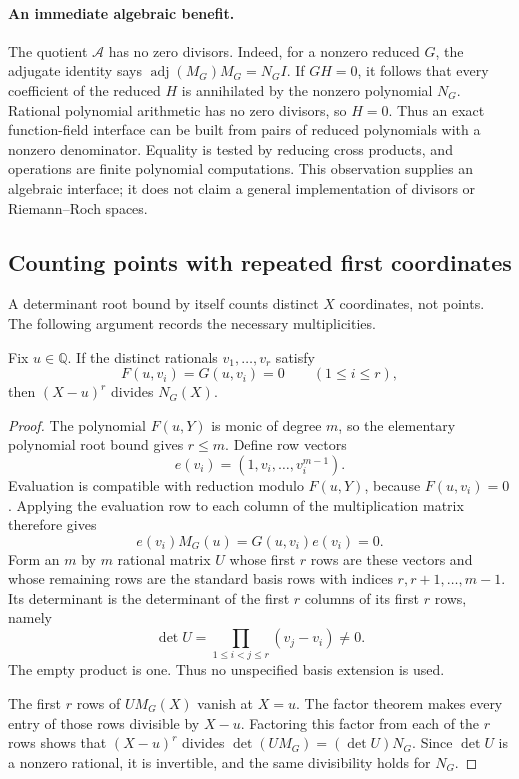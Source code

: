 \paragraph{An immediate algebraic benefit.}
The quotient $\mathcal A$ has no zero divisors.  Indeed, for a nonzero
reduced $G$, the adjugate identity says
$\operatorname{adj}(M_G)M_G=N_G I$.  If $GH=0$, it follows that every
coefficient of the reduced $H$ is annihilated by the nonzero polynomial
$N_G$.  Rational polynomial arithmetic has no zero divisors, so $H=0$.
Thus an exact function-field interface can be built from pairs of
reduced polynomials with a nonzero denominator.  Equality is tested by
reducing cross products, and operations are finite polynomial
computations.  This observation supplies an algebraic interface; it does
not claim a general implementation of divisors or Riemann--Roch spaces.

\subsection{Counting points with repeated first coordinates}

A determinant root bound by itself counts distinct $X$ coordinates, not
points.  The following argument records the necessary multiplicities.

\begin{lemma}\label{lem:weighted-fiber}
Fix $u\in\mathbb Q$.  If the distinct rationals
$v_1,\ldots,v_r$ satisfy
\[
 F(u,v_i)=G(u,v_i)=0\qquad(1\le i\le r),
\]
then $(X-u)^r$ divides $N_G(X)$.
\end{lemma}

\begin{proof}
The polynomial $F(u,Y)$ is monic of degree $m$, so the elementary
polynomial root bound gives $r\le m$.  Define row vectors
\[
 e(v_i)=(1,v_i,\ldots,v_i^{m-1}).
\]
Evaluation is compatible with reduction modulo $F(u,Y)$, because
$F(u,v_i)=0$.  Applying the evaluation row to each column of the
multiplication matrix therefore gives
\[
 e(v_i)M_G(u)=G(u,v_i)e(v_i)=0.
\]
Form an $m$ by $m$ rational matrix $U$ whose first $r$ rows are these
vectors and whose remaining rows are the standard basis rows with
indices $r,r+1,\ldots,m-1$.  Its determinant is the determinant of the
first $r$ columns of its first $r$ rows, namely
\[
 \det U=\prod_{1\le i<j\le r}(v_j-v_i)\ne0.
\]
The empty product is one.  Thus no unspecified basis extension is used.

The first $r$ rows of $UM_G(X)$ vanish at $X=u$.  The factor theorem
makes every entry of those rows divisible by $X-u$.  Factoring this
factor from each of the $r$ rows shows that $(X-u)^r$ divides
$\det(UM_G)=(\det U)N_G$.  Since $\det U$ is a nonzero rational,
it is invertible, and the same divisibility holds for $N_G$.
\end{proof}

